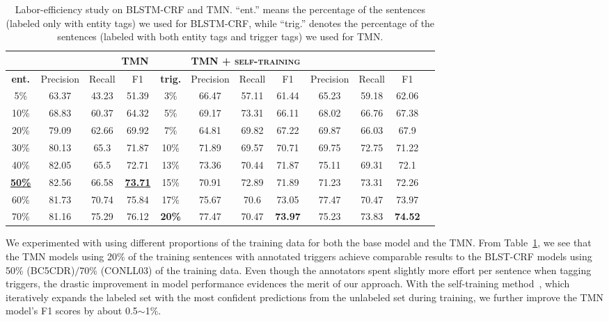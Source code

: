 \begin{table}[h]
{\begin{singlespace}
\begin{tabular}{@{}>{\columncolor{LightCyan}}c|ccc|>{\columncolor{LightCyan}}c|ccc|cccc@{}}
			\multicolumn{3}{c|}{\textsc{BLSTM-CRF}}  & 
			&
			\multicolumn{3}{c|}{\textsc{TMN}}  &  
			\multicolumn{3}{c}{\textsc{TMN + self-training}}  
			\\
			\midrule
			\rowcolor{white}\textbf{ent.}  &
			\multicolumn{1}{c}{Precision}  &    
			\multicolumn{1}{c}{Recall}  &
			\multicolumn{1}{c|}{F1}  &  
			\textbf{trig.}  &
			\multicolumn{1}{c}{Precision}  &    
			\multicolumn{1}{c}{Recall}  &
			\multicolumn{1}{c|}{F1} &
			\multicolumn{1}{c}{Precision}  &    
			\multicolumn{1}{c}{Recall}  &
			\multicolumn{1}{c}{F1}  & 
			\\ 
			\midrule 
			5\%  &  63.37 & 43.23 & 51.39 & 3\%  & 66.47 & 57.11 & 61.44 & 65.23 & 59.18 & 62.06 \\
			10\% &  68.83 & 60.37 & 64.32 & 5\%  & 69.17 & 73.31 & 66.11 & 68.02 & 66.76 & 67.38   \\
            20\% &  79.09 & 62.66 & 69.92 & 7\%  & 64.81 & 69.82 & 67.22 & 69.87 & 66.03 & 67.9   \\
            30\% &  80.13 & 65.3 & 71.87 & 10\% & 71.89 & 69.57 & 70.71 & 69.75 & 72.75 & 71.22   \\
            40\% &  82.05 & 65.5 & 72.71 & 13\% & 73.36 & 70.44 & 71.87 & 75.11 & 69.31 & 72.1   \\
            \textbf{\underline{50\%} }&  82.56 & 66.58 & \textbf{\underline{73.71}} & 15\% & 70.91 & 72.89 & 71.89 & 71.23 & 73.31 & 72.26  \\
            60\% &  81.73 & 70.74 & 75.84 & 17\% & 75.67 & 70.6 & 73.05 & 77.47 & 70.47 & 73.97   \\
            70\% &  81.16 & 75.29 & 76.12 & \textbf{20\% }& 77.47 & 70.47 & \textbf{73.97} & 75.23 & 73.83 & \textbf{74.52}   \\
			\midrule
			\bottomrule
		\end{tabular}
		\end{singlespace}
	}
	\caption{Labor-efficiency study on BLSTM-CRF and TMN. ``ent.'' means the percentage of the sentences (labeled only with entity tags) we used for BLSTM-CRF, while ``trig.'' denotes the percentage of the sentences (labeled with both entity tags and trigger tags) we used for TMN. }
	\label{tab:results}
\end{table}

We experimented with using different proportions of the training data for both the base model and the TMN.
From Table~\ref{tab:results}, we see that the TMN models using 20\% of the training sentences with annotated triggers achieve comparable results to the BLST-CRF models using 50\% (BC5CDR)$/$70\% (CONLL03) of the training data.
Even though the annotators spent slightly more effort per sentence when tagging triggers, the drastic improvement in model performance evidences the merit of our approach.
With the self-training method~\citep{Rosenberg2005SemiSupervisedSO}, which iteratively expands the labeled set with the most confident predictions from the unlabeled set during training, we further improve the TMN model's F1 scores by about 0.5$\sim$1\%. 



